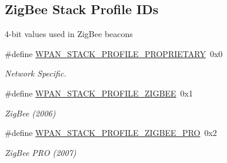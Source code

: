 \subsection*{Zig\-Bee Stack Profile I\-Ds}
\label{_amgrp53635a0a6c11f45c3462a5d59d0da424}%
4-\/bit values used in Zig\-Bee beacons \begin{DoxyCompactItemize}
\item 
\hypertarget{group__wpan__aps_ga6c74dccd9d25158e8fae5f405708a412}{\#define \hyperlink{group__wpan__aps_ga6c74dccd9d25158e8fae5f405708a412}{W\-P\-A\-N\-\_\-\-S\-T\-A\-C\-K\-\_\-\-P\-R\-O\-F\-I\-L\-E\-\_\-\-P\-R\-O\-P\-R\-I\-E\-T\-A\-R\-Y}~0x0}\label{group__wpan__aps_ga6c74dccd9d25158e8fae5f405708a412}

\begin{DoxyCompactList}\small\item\em Network Specific. \end{DoxyCompactList}\item 
\hypertarget{group__wpan__aps_ga7836a9ee2baaed24f5f4f8368aee7ef4}{\#define \hyperlink{group__wpan__aps_ga7836a9ee2baaed24f5f4f8368aee7ef4}{W\-P\-A\-N\-\_\-\-S\-T\-A\-C\-K\-\_\-\-P\-R\-O\-F\-I\-L\-E\-\_\-\-Z\-I\-G\-B\-E\-E}~0x1}\label{group__wpan__aps_ga7836a9ee2baaed24f5f4f8368aee7ef4}

\begin{DoxyCompactList}\small\item\em Zig\-Bee (2006) \end{DoxyCompactList}\item 
\hypertarget{group__wpan__aps_ga9f0ebaaaa46a7bdaa646050b927d5dbb}{\#define \hyperlink{group__wpan__aps_ga9f0ebaaaa46a7bdaa646050b927d5dbb}{W\-P\-A\-N\-\_\-\-S\-T\-A\-C\-K\-\_\-\-P\-R\-O\-F\-I\-L\-E\-\_\-\-Z\-I\-G\-B\-E\-E\-\_\-\-P\-R\-O}~0x2}\label{group__wpan__aps_ga9f0ebaaaa46a7bdaa646050b927d5dbb}

\begin{DoxyCompactList}\small\item\em Zig\-Bee P\-R\-O (2007) \end{DoxyCompactList}\end{DoxyCompactItemize}
